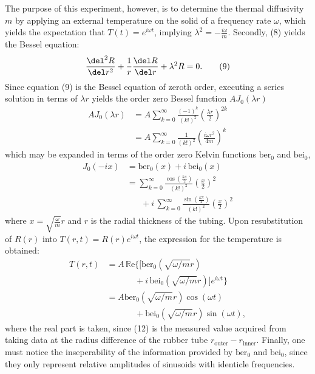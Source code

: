 \documentclass[11pt]{article}
\begin{document}
\begin{multicols}{2}
    The purpose of this experiment, however, is to determine the thermal diffusivity $m$ by applying an external temperature on the solid of a frequency rate $\omega$, which yields the expectation that $T(t) = e^{i\omega t}$, implying $\lambda^2 = -\frac{i\omega}{m}$. Secondly, (8) yields the Bessel equation:
    \[
        \frac{\del^2 R}{\del r^2} + \frac{1}{r}\frac{\del R}{\del r} + \lambda^2 R = 0. \tag{9}
    \]
    Since equation (9) is the Bessel equation of zeroth order, executing a series solution in terms of $\lambda r$ yields the order zero Bessel function $A J_0(\lambda r)$
    \begin{align*}
        AJ_0(\lambda r) &= A\sum_{k=0}^{\infty}\frac{(-1)^k}{(k!)^2}\left(\frac{\lambda r}{2}\right)^{2k} \tag{10.1}  \\
        &=A\sum_{k=0}^{\infty}\frac{1}{(k!)^2}\left(\frac{i\omega r^2}{4m}\right)^{k} \tag{10.2}
    \end{align*}
    \nd which may be expanded in terms of the order zero Kelvin functions $\text{ber}_0$ and $\text{bei}_0$, 
    \begin{align*}
        J_0(-ix) &= \text{ber}_0(x) + i\, \text{bei}_0(x) \tag{11.1}\\ 
        &= \sum_{k=0}^{\infty} \frac{\cos\left(\frac{k\pi}{2}\right)}{(k!)^2}\left(\frac{x}{2}\right)^2\\
        &\hspace{20pt}+ i\, \sum_{k=0}^{\infty} \frac{\sin\left(\frac{k\pi}{2}\right)}{(k!)^2}\left(\frac{x}{2}\right)^2\tag{11.2} 
    \end{align*}
    \nd where $x = \sqrt{\frac{\omega}{m}}r$ and $r$ is the radial thickness of the tubing. Upon resubstitution of $R(r)$ into $T(r,t) = R(r)e^{i\omega t}$, the expression for the temperature is obtained: 
   \begin{align*}
        T(r, t) &= A\, \mathbb{R}\text{e}\bigg\{\bigg[\text{ber}_0(\sqrt{\omega/m}r)\\
        &\hspace{40pt} + i\, \text{bei}_0(\sqrt{\omega/m}r)\bigg]e^{i\omega t}\bigg\} \\
        &=   A\text{ber}_0(\sqrt{\omega/m}r)\cos(\omega t) \\
        & \hspace{40pt} +  \text{bei}_0(\sqrt{\omega/m}r)\sin(\omega t),  \tag{12}
    \end{align*} 
    \nd where the real part is taken, since (12) is the measured value acquired from taking data at the radius difference of the rubber tube $r_{\text{outer}} - r_{\text{inner}}$. Finally, one must notice the inseperability of the information provided by $\text{ber}_0$ and $\text{bei}_0$, since they only represent relative amplitudes of sinusoids with identicle frequencies.






\end{multicols}
\end{document}
